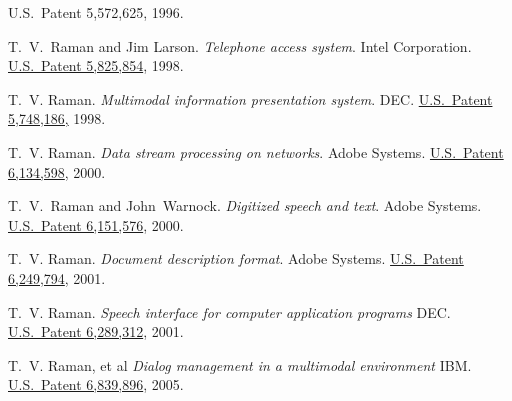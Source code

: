 \documentclass{article}
\begin{document}
\begin{compactitem}{}
{U.S.\ Patent 5,572,625},  1996.
\item  T.\ V.\ Raman and Jim Larson.
 \emph{Telephone access system}.  
 Intel Corporation.
 \href{http://patft.uspto.gov/netacgi/nph-Parser?TERM1=5,825,854&Sect1=PTO1&Sect2=HITOFF&d=PALL&p=1&u=\%2Fnetahtml\%2Fsrchnum.htm&r=0&f=S&l=50}%
{U.S.\ Patent 5,825,854},  1998.
\item  T.~V. Raman.  
  \emph{Multimodal information presentation system}.  
 DEC.\@
 \href{http://patft.uspto.gov/netacgi/nph-Parser?TERM1=5,748,186&Sect1=PTO1&Sect2=HITOFF&d=PALL&p=1&u=\%2Fnetahtml\%2Fsrchnum.htm&r=0&f=S&l=50}%
{U.S.\ Patent 5,748,186,}  1998.
\item  T.~V. Raman.  
 \emph{Data
    stream processing on networks}.  
 Adobe Systems.
 \href{http://patft.uspto.gov/netacgi/nph-Parser?TERM1=6,134,598&Sect1=PTO1&Sect2=HITOFF&d=PALL&p=1&u=\%2Fnetahtml\%2Fsrchnum.htm&r=0&f=S&l=50}%
{U.S.\ Patent 6,134,598},  2000.
\item   T.~V.\ Raman and John~Warnock.
 \emph{Digitized speech and text}.  
 Adobe
  Systems.
 \href{http://patft.uspto.gov/netacgi/nph-Parser?TERM1=6,151,576&Sect1=PTO1&Sect2=HITOFF&d=PALL&p=1&u=\%2Fnetahtml\%2Fsrchnum.htm&r=0&f=S&l=50}%
{U.S.\ Patent 6,151,576},  2000.
\item   T.~V. Raman.  
 \emph{Document
    description format}.  
 Adobe Systems.
 \href{http://patft.uspto.gov/netacgi/nph-Parser?TERM1=6,249,794&Sect1=PTO1&Sect2=HITOFF&d=PALL&p=1&u=\%2Fnetahtml\%2Fsrchnum.htm&r=0&f=S&l=50}%
{U.S.\ Patent 6,249,794},  2001.
\item   T.~V. Raman.  
  \emph{Speech interface for computer application programs\/}
 DEC.\@
  \href{http://patft.uspto.gov/netacgi/nph-Parser?Sect1=PTO1&Sect2=HITOFF&d=PALL&p=1&u=/netahtml/srchnum.htm&r=1&f=G&l=50&s1='6289312'.WKU.&OS=PN/6289312&RS=PN/6289312}
  {U.S.\ Patent 6,289,312},  2001.
\item   T.~V. Raman,  et al 
  \emph{Dialog management  in a
multimodal environment\/}
 IBM.  \@
  \href{http://patft.uspto.gov/netacgi/nph-Parser?Sect1=PTO1\&Sect2=HITOFF\&d=PALL\&p=1\&u=/netahtml/srchnum.htm\&r=1\&f=G\&l=50\&s1=6839896.WKU.\&OS=PN/6839896\&RS=PN/6839896}
  {U.S.\ Patent 6,839,896},  2005.
% 
% 

\end{compactitem}
\end{document}
